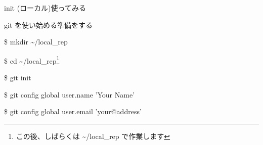 
\begin{frame}[t]{init (ローカル)}{使ってみる}

  git を使い始める準備をする
  \vspace{4ex}

  \$ mkdir \~{}/local\_rep

  \$ cd \~{}/local\_rep\footnote{この後、しばらくは \~{}/local\_rep で作業します}

  \$ git init

  \$ git config {\dhyphen}global user.name 'Your Name'

  \$ git config {\dhyphen}global user.email 'your@address'

\end{frame}


